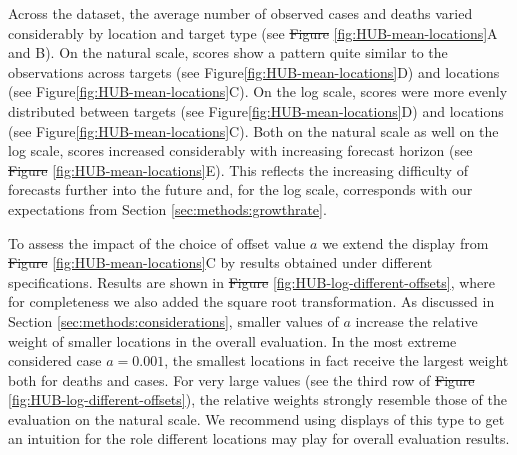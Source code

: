 \documentclass[10pt,letterpaper]{article} %
\providecommand{\DIFaddtex}[1]{{\protect\color{blue}\uwave{#1}}} %
\providecommand{\DIFdeltex}[1]{{\protect\color{red}\sout{#1}}}                      %
\providecommand{\DIFaddbegin}{} %
\providecommand{\DIFaddend}{} %
\providecommand{\DIFdelbegin}{} %
\providecommand{\DIFdelend}{} %
\providecommand{\DIFadd}[1]{\texorpdfstring{\DIFaddtex{#1}}{#1}} %
\providecommand{\DIFdel}[1]{\texorpdfstring{\DIFdeltex{#1}}{}} %
\newcommand{\DIFscaledelfig}{0.5}
\newlength{\DIFdelgraphicswidth} %
\newlength{\DIFdelgraphicsheight} %
\newcommand{\DIFaddincludegraphics}[2][]{{\color{blue}\fbox{\DIFOincludegraphics[#1]{#2}}}} %
\newcommand{\DIFdelincludegraphics}[2][]{%
\sbox{\DIFdelgraphicsbox}{\DIFOincludegraphics[#1]{#2}}%
\settoboxwidth{\DIFdelgraphicswidth}{\DIFdelgraphicsbox} %
\settoboxtotalheight{\DIFdelgraphicsheight}{\DIFdelgraphicsbox} %
\scalebox{\DIFscaledelfig}{%
\parbox[b]{\DIFdelgraphicswidth}{\usebox{\DIFdelgraphicsbox}\\[-\baselineskip] \rule{\DIFdelgraphicswidth}{0em}}\llap{\resizebox{\DIFdelgraphicswidth}{\DIFdelgraphicsheight}{%
\setlength{\unitlength}{\DIFdelgraphicswidth}%
\begin{picture}(1,1)%
\thicklines\linethickness{2pt} %
{\color[rgb]{1,0,0}\put(0,0){\framebox(1,1){}}}%
{\color[rgb]{1,0,0}\put(0,0){\line( 1,1){1}}}%
{\color[rgb]{1,0,0}\put(0,1){\line(1,-1){1}}}%
\end{picture}%
}\hspace*{3pt}}} %
} %
\DeclareRobustCommand{\DIFaddbegin}{\DIFOaddbegin \let\includegraphics\DIFaddincludegraphics} %
\DeclareRobustCommand{\DIFaddend}{\DIFOaddend \let\includegraphics\DIFOincludegraphics} %
\DeclareRobustCommand{\DIFdelbegin}{\DIFOdelbegin \let\includegraphics\DIFdelincludegraphics} %
\DeclareRobustCommand{\DIFdelend}{\DIFOaddend \let\includegraphics\DIFOincludegraphics} %
\begin{document}
Across the dataset, the average number of observed cases and deaths varied considerably by location and target type (see \DIFdelbegin \DIFdel{Figure }\DIFdelend \DIFaddbegin \DIFadd{Fig }\DIFaddend \ref{fig:HUB-mean-locations}A and B). On the natural scale, scores show a pattern quite similar to the observations across targets (see Figure\ref{fig:HUB-mean-locations}D) and locations (see Figure\ref{fig:HUB-mean-locations}C). On the log scale, scores were more evenly distributed between targets (see Figure\ref{fig:HUB-mean-locations}D) and locations (see Figure\ref{fig:HUB-mean-locations}C). Both on the natural scale as well on the log scale, scores increased considerably with increasing forecast horizon (see \DIFdelbegin \DIFdel{Figure }\DIFdelend \DIFaddbegin \DIFadd{Fig }\DIFaddend \ref{fig:HUB-mean-locations}E). This reflects the increasing difficulty of forecasts further into the future and, for the log scale, corresponds with our expectations from Section \ref{sec:methods:growthrate}. 

To assess the impact of the choice of offset value $a$ we extend the display from \DIFdelbegin \DIFdel{Figure }\DIFdelend \DIFaddbegin \DIFadd{Fig }\DIFaddend \ref{fig:HUB-mean-locations}C by results obtained under different specifications. Results are shown in \DIFdelbegin \DIFdel{Figure }\DIFdelend \DIFaddbegin \DIFadd{Fig }\DIFaddend \ref{fig:HUB-log-different-offsets}, where for completeness we also added the square root transformation. As discussed in Section \ref{sec:methods:considerations}, smaller values of $a$ increase the relative weight of smaller locations in the overall evaluation. In the most extreme considered case $a = 0.001$, the smallest locations in fact receive the largest weight both for deaths and cases. For very large values (see the third row of \DIFdelbegin \DIFdel{Figure }\DIFdelend \DIFaddbegin \DIFadd{Fig }\DIFaddend \ref{fig:HUB-log-different-offsets}), the relative weights strongly resemble those of the evaluation on the natural scale. We recommend using displays of this type to get an intuition for the role different locations may play for overall evaluation results.
\end{document}
